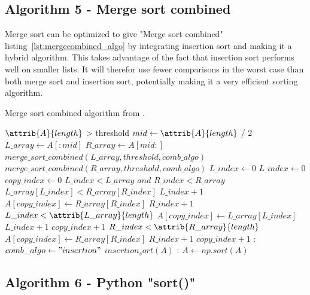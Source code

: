 \documentclass[sigconf, nonacm, natbib, screen, balance=False]{acmart}
\begin{document}
\subsection{Algorithm 5 - Merge sort combined}\label{sec:algo5}

Merge sort can be optimized to give "Merge sort combined" listing~\ref{lst:mergecombined_algo} by integrating insertion sort and making it a hybrid algorithm. This takes advantage of the fact that insertion sort performs well on smaller lists. It will therefor use fewer comparisons in the worst case than both merge sort and insertion sort, potentially making it a very efficient sorting algorithm.  

\begin{listing}
  \caption{Merge sort combined algorithm from \citet[Ch.~2.1]{CLRS_2009}.}
  \label{lst:mergecombined_algo}
  
 \begin{codebox}
    \li \If $\attrib{A}{length}$ > threshold
    \li \Do
    $mid \gets \attrib{A}{length}$ / 2 
    \li $L\_array\gets A[:mid]$
    \li $R\_array\gets A[mid:]$
    \li $merge\_sort\_combined(L\_array, threshold, comb\_algo)$
    \li $merge\_sort\_combined(R\_array, threshold, comb\_algo)$
    \li $L\_index\gets 0$
    \li $L\_index\gets 0$
    \li $copy\_index\gets 0$
    \li \While $L\_index < L\_array$ $and$ $R\_index < R\_array$ 
    \li \Do
    \If $L\_array[L\_index] < R\_array[R\_index]$
    \li \Do
    $L\_index + 1$
    \li \Else
    \li $A[copy\_index] \gets R\_array[R\_index]$
    \li $R\_index + 1$
    \End
    \End
    \li \While $L\_index < \attrib{L\_array}{length}$
    \li \Do
    $A[copy\_index] \gets L\_array[L\_index]$
    \li $L\_index + 1$
    \li $copy\_index + 1$
    \End
    \li \While $R\_index < \attrib{R\_array}{length}$
    \li \Do
    $A[copy\_index] \gets R\_array[R\_index]$
    \li $R\_index + 1$
    \li $copy\_index + 1$
    \End
    \li \Else:
    \li \If $comb\_algo \gets "insertion"$
    \li \Do
    $insertion_sort(A)$
    \li \Else:
    $A \gets np.sort(A)$
  \end{codebox}
\end{listing}

\subsection{Algorithm 6 - Python "sort()" }\label{sec:algo6}
\end{document}
